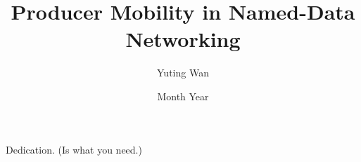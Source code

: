 \documentclass[oneside,hidelinks]{glasgowthesis}
\begin{document}
\pagestyle{empty}

\title{Producer Mobility in Named-Data Networking}
\author{Yuting Wan}
\date{Month Year}

\maketitle

\cleardoublepage

 

\newpage
 

\cleardoublepage
\vspace*{1.75in}
\begin{flushright} Dedication. (Is what you need.)\end{flushright}








\tableofcontents
\listoftables
\listoffigures

\cleardoublepage
\pagestyle{fancy}
\setcounter{page}{1}
\end{document}
